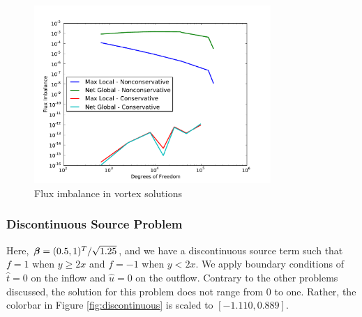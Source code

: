 \documentclass[Proposal.tex]{subfiles}
\begin{document}
\begin{figure}[p]
\centering
\includegraphics[width=0.8\textwidth]{figs/Vortex/modifiedFlux.pdf}
\caption{Flux imbalance in vortex solutions}
\label{fig:vortex_flux}
\end{figure}

\subsubsection{Discontinuous Source Problem}
Here, $\boldsymbol\beta=(0.5,1)^T/\sqrt{1.25}$, and we have a discontinuous source term
such that $f=1$ when $y\ge2x$ and $f=-1$ when $y<2x$. We apply boundary
conditions of $\hat t=0$ on the inflow and $\hat u=0$ on the outflow. Contrary
to the other problems discussed, the solution for this problem does not range
from 0 to one. Rather, the colorbar in Figure \ref{fig:discontinuous} is
scaled to  $[-1.110,0.889]$.
\end{document}
